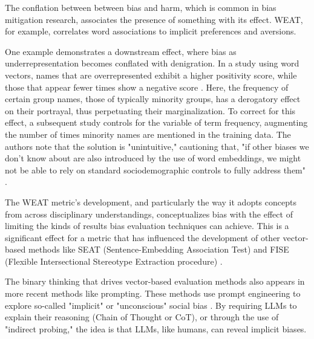 \documentclass[11pt]{article}
\begin{document}
The conflation between between bias and harm, which is common
in bias mitigation research, associates the presence of something
with its effect. WEAT, for example, correlates word associations to
implicit preferences and aversions. 

One example demonstrates a downstream effect, where bias as
underrepresentation becomes conflated with denigration. In a study
using word vectors, names that are overrepresented exhibit a higher
positivity score, while those that appear fewer times show a negative
score \citep{wolfe:2021}. Here, the frequency of certain group names,
those of typically minority groups, has a derogatory effect on their
portrayal, thus perpetuating their marginalization. To correct for
this effect, a subsequent study \citet{vanloon:2022} controls for the
variable of term frequency, augmenting the number of times minority
names are mentioned in the training data. The authors note that the
solution is "unintuitive," cautioning that, "if other biases we don’t
know about are also introduced by the use of word embeddings, we might
not be able to rely on standard sociodemographic controls to fully
address them" \citep{vanloon:2022}.

The WEAT metric's development, and particularly the way it adopts
concepts from across disciplinary understandings, conceptualizes bias
with the effect of limiting the kinds of results bias evaluation
techniques can achieve. This is a significant effect for a metric that
has influenced the development of other vector-based methods like SEAT
(Sentence-Embedding Association Test) and FISE (Flexible
Intersectional Stereotype Extraction
procedure) \citep{caliskan:2017,may:2019,charlesworth:2024}.

The binary thinking that drives vector-based evaluation methods also
appears in more recent methods like prompting. These methods use
prompt engineering to explore so-called "implicit" or "unconscious"
social bias \citep{kaneko:2024,Dong:2024}. By requiring LLMs to
explain their reasoning (Chain of Thought or CoT), or through the use
of "indirect probing," the idea is that LLMs, like humans, can reveal
implicit biases.
\end{document}
